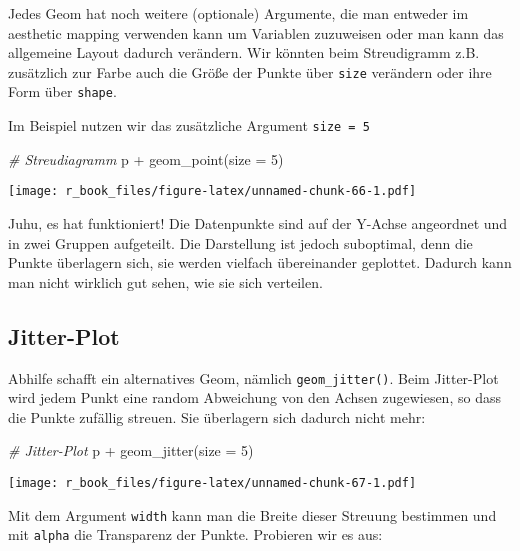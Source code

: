 \documentclass[
]{book}
\newenvironment{Shaded}{\begin{snugshade}}{\end{snugshade}}
\newcommand{\AttributeTok}[1]{\textcolor[rgb]{0.77,0.63,0.00}{#1}}
\newcommand{\CommentTok}[1]{\textcolor[rgb]{0.56,0.35,0.01}{\textit{#1}}}
\newcommand{\DecValTok}[1]{\textcolor[rgb]{0.00,0.00,0.81}{#1}}
\newcommand{\FunctionTok}[1]{\textcolor[rgb]{0.00,0.00,0.00}{#1}}
\newcommand{\NormalTok}[1]{#1}
\newcommand{\SpecialCharTok}[1]{\textcolor[rgb]{0.00,0.00,0.00}{#1}}
\begin{document}
Jedes Geom hat noch weitere (optionale) Argumente, die man entweder im aesthetic mapping verwenden kann um Variablen zuzuweisen oder man kann das allgemeine Layout dadurch verändern. Wir könnten beim Streudigramm z.B. zusätzlich zur Farbe auch die Größe der Punkte über \texttt{size} verändern oder ihre Form über \texttt{shape}.

Im Beispiel nutzen wir das zusätzliche Argument \texttt{size\ =\ 5}

\begin{Shaded}
\begin{Highlighting}[]
\CommentTok{\# Streudiagramm}
\NormalTok{p }\SpecialCharTok{+} \FunctionTok{geom\_point}\NormalTok{(}\AttributeTok{size =} \DecValTok{5}\NormalTok{)}
\end{Highlighting}
\end{Shaded}

\texttt{[image: r\_book\_files/figure-latex/unnamed-chunk-66-1.pdf]}

Juhu, es hat funktioniert! Die Datenpunkte sind auf der Y-Achse angeordnet und in zwei Gruppen aufgeteilt. Die Darstellung ist jedoch suboptimal, denn die Punkte überlagern sich, sie werden vielfach übereinander geplottet. Dadurch kann man nicht wirklich gut sehen, wie sie sich verteilen.

\hypertarget{jitter-plot}{%
\subsection{Jitter-Plot}\label{jitter-plot}}

Abhilfe schafft ein alternatives Geom, nämlich \texttt{geom\_jitter()}. Beim Jitter-Plot wird jedem Punkt eine random Abweichung von den Achsen zugewiesen, so dass die Punkte zufällig streuen. Sie überlagern sich dadurch nicht mehr:

\begin{Shaded}
\begin{Highlighting}[]
\CommentTok{\# Jitter{-}Plot}
\NormalTok{p }\SpecialCharTok{+} \FunctionTok{geom\_jitter}\NormalTok{(}\AttributeTok{size =} \DecValTok{5}\NormalTok{)}
\end{Highlighting}
\end{Shaded}

\texttt{[image: r\_book\_files/figure-latex/unnamed-chunk-67-1.pdf]}

Mit dem Argument \texttt{width} kann man die Breite dieser Streuung bestimmen und mit \texttt{alpha} die Transparenz der Punkte. Probieren wir es aus:
\end{document}

